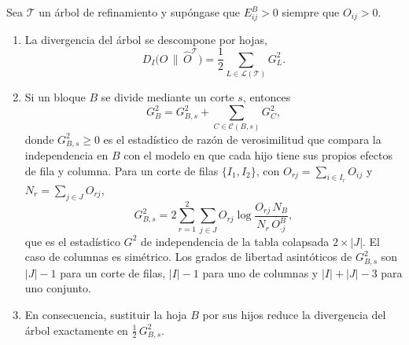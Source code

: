 \begin{proposicion}\label{prop:ganancia}
Sea $\mathcal{T}$ un árbol de refinamiento y supóngase que $E^{B}_{ij}>0$
siempre que $O_{ij}>0$.
\begin{enumerate}
  \item[(a)] La divergencia del árbol se descompone por hojas,
  \begin{equation}\label{eq:prop-desc-hojas}
    D_I\bigl(O \,\|\, \hat O^{\mathcal{T}}\bigr)
    = \frac12 \sum_{L\in\mathcal{L}(\mathcal{T})} G^2_L .
  \end{equation}
  \item[(b)] Si un bloque $B$ se divide mediante un corte $s$, entonces
  \begin{equation}\label{eq:prop-cadena}
    G^2_B = G^2_{B,s} + \sum_{C\in\mathcal{C}(B,s)} G^2_C ,
  \end{equation}
  donde $G^2_{B,s}\ge 0$ es el estadístico de razón de verosimilitud que
  compara la independencia en $B$ con el modelo en que cada hijo tiene sus
  propios efectos de fila y columna. Para un corte de filas
  $\{I_1, I_2\}$, con $O_{rj} = \sum_{i\in I_r} O_{ij}$ y
  $N_r = \sum_{j\in J} O_{rj}$,
  \begin{equation}\label{eq:prop-G2-colapsada}
    G^2_{B,s} = 2\sum_{r=1}^{2}\sum_{j\in J} O_{rj}
      \log\frac{O_{rj}\,N_B}{N_r\,O^{B}_{\cdot j}},
  \end{equation}
  que es el estadístico $G^2$ de independencia de la tabla colapsada
  $2\times|J|$. El caso de columnas es simétrico. Los grados de libertad
  asintóticos de $G^2_{B,s}$ son $|J|-1$ para un corte de filas, $|I|-1$
  para uno de columnas y $|I|+|J|-3$ para uno conjunto.
  \item[(c)] En consecuencia, sustituir la hoja $B$ por sus hijos reduce la
  divergencia del árbol exactamente en $\tfrac12\, G^2_{B,s}$.
\end{enumerate}
\end{proposicion}


